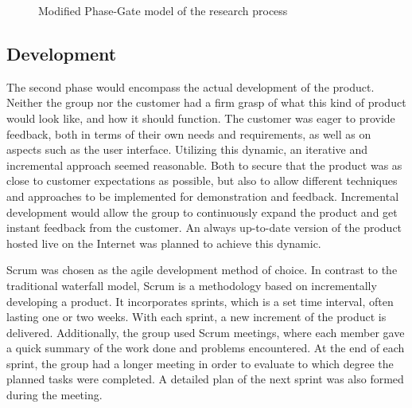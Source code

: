 \begin{center}
  \begin{figure}[ht!]
    \caption{Modified Phase-Gate model of the research process}
    \label{fig:phasegate}
  \end{figure}
\end{center}

\subsection{Development}
\label{subsec:process_and_methodology-process_methodology-development}

The second phase would encompass the actual development of the product. Neither the group nor the customer had a firm grasp of what this kind of product would look like, and how it should function. The customer was eager to provide feedback, both in terms of their own needs and requirements, as well as on aspects such as the user interface. Utilizing this dynamic, an iterative and incremental approach seemed reasonable. Both to secure that the product was as close to customer expectations as possible, but also to allow different techniques and approaches to be implemented for demonstration and feedback. Incremental development would allow the group to continuously expand the product and get instant feedback from the customer. An always up-to-date version of the product hosted live on the Internet was planned to achieve this dynamic.

Scrum \cite{scrum} was chosen as the agile development method of choice. In contrast to the traditional waterfall model, Scrum is a methodology based on incrementally developing a product. It incorporates sprints, which is a set time interval, often lasting one or two weeks. With each sprint, a new increment of the product is delivered. Additionally, the group used Scrum meetings, where each member gave a quick summary of the work done and problems encountered. At the end of each sprint, the group had a longer meeting in order to evaluate to which degree the planned tasks were completed. A detailed plan of the next sprint was also formed during the meeting.

